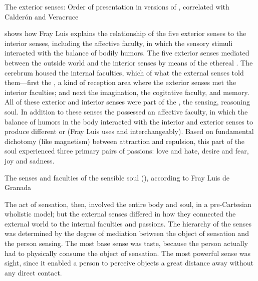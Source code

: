 \begin{table}
    \caption{The exterior senses: Order of presentation in versions of , correlated with Calderón and Veracruce}
    \label{table:senses-order}
\end{table}

 shows how Fray Luis explains the relationship of the five exterior senses to the interior senses, including the affective faculty, in which the sensory stimuli interacted with the balance of bodily humors.
The five exterior senses mediated between the outside world and the interior senses by means of the ethereal .
The cerebrum housed the internal faculties, which  of what the external senses told them---first the , a kind of reception area where the exterior senses met the interior faculties; and next the imagination, the cogitative faculty, and memory.
All of these exterior and interior senses were part of the , the sensing, reasoning soul.
In addition to these senses the  possessed an affective faculty, in which the balance of humors in the body interacted with the interior and exterior senses to produce different  or  (Fray Luis uses  and  interchangeably).
Based on fundamental dichotomy (like magnetism) between attraction and repulsion, this  part of the soul experienced three primary pairs of passions: love and hate, desire and fear, joy and sadness.

\begin{table}
    \caption{The senses and faculties of the sensible soul (), according to Fray Luis de Granada}
    \label{table:senses-fray-luis}
\end{table}

The act of sensation, then, involved the entire body and soul, in a pre-Cartesian wholistic model; but the external senses differed in how they connected the external world to the internal faculties and passions.
The hierarchy of the senses was determined by the degree of mediation between the object of sensation and the person sensing.
The most base sense was taste, because the person actually had to physically consume the object of sensation.
The most powerful sense was sight, since it enabled a person to perceive objects a great distance away without any direct contact.

